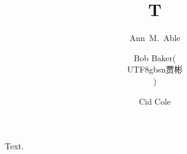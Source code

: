 \documentclass{aa}
\begin{document}
\title{T}
\author{
         Ann~M.~Able \inst{\ref{X}}
    \and Bob Baker(\begin{CJK*}{UTF8}{gbsn}贾彬\end{CJK*}) \inst{\ref{X},\ref{Y}}
    \and Cid Cole\inst{\ref{Y}}
}
\maketitle
Text.
\end{document}
